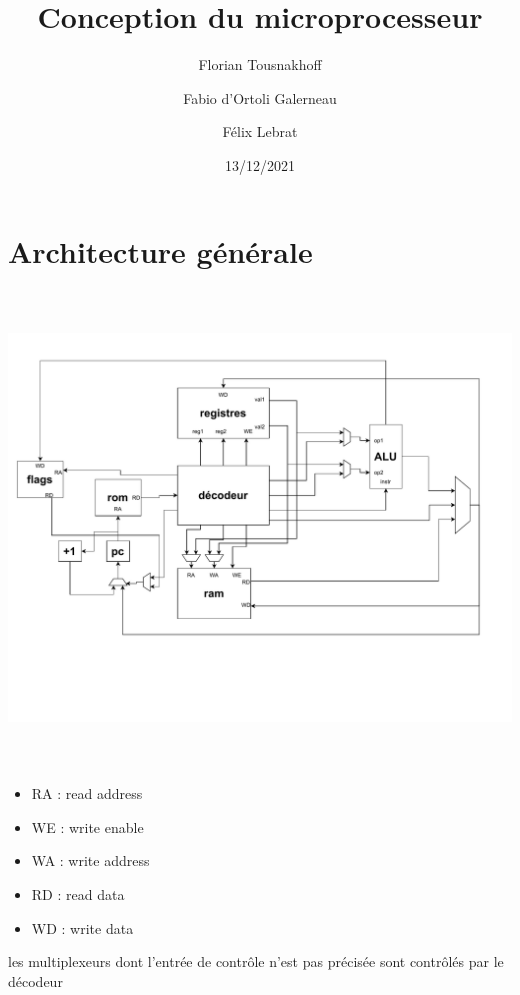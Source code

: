 \documentclass{article}
\title{Conception du microprocesseur}
\date{13/12/2021}
\author{Florian Tousnakhoff \and Fabio d'Ortoli Galerneau \and Félix Lebrat}
\begin{document}
    \maketitle
    \section{Architecture générale}

    \includegraphics[width=17.8cm,height=12.6cm,page=1]{schema.pdf}
    \begin{itemize}
        \item RA : read address
        \item WE : write enable
        \item WA : write address
        \item RD : read data
        \item WD : write data
    \end{itemize}
    les multiplexeurs dont l'entrée de contrôle n'est pas précisée sont
    contrôlés par le décodeur
\end{document}
